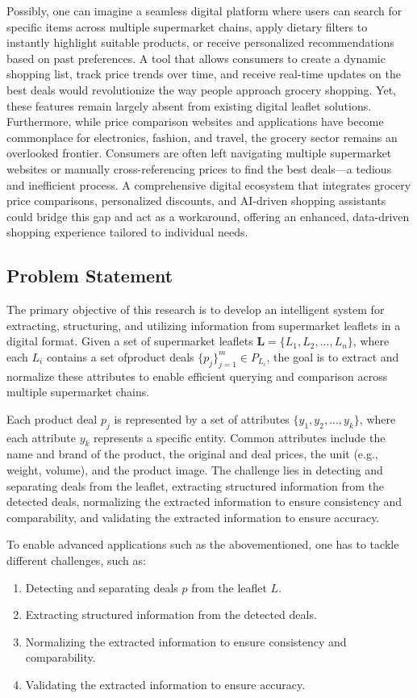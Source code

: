\documentclass[11pt]{article}
\begin{document}
Possibly, one can imagine a seamless digital platform where users can search for specific items across multiple supermarket chains, apply dietary filters to instantly highlight suitable products, or receive personalized recommendations based on past preferences. A tool that allows consumers to create a dynamic shopping list, track price trends over time, and receive real-time updates on the best deals would revolutionize the way people approach grocery shopping. Yet, these features remain largely absent from existing digital leaflet solutions. Furthermore, while price comparison websites and applications have become commonplace for electronics, fashion, and travel, the grocery sector remains an overlooked frontier. Consumers are often left navigating multiple supermarket websites or manually cross-referencing prices to find the best deals—a tedious and inefficient process. A comprehensive digital ecosystem that integrates grocery price comparisons, personalized discounts, and AI-driven shopping assistants could bridge this gap and act as a workaround, offering an enhanced, data-driven shopping experience tailored to individual needs.

\subsection{Problem Statement}
The primary objective of this research is to develop an intelligent system for extracting, structuring, and utilizing information from supermarket leaflets in a digital format. Given a set of supermarket leaflets $\mathbf{L} = \{L_1, L_2, ..., L_n\}$, where each $L_i$ contains a set ofproduct deals $\{p_j\}_{j=1}^{m} \in P_{L_i}$, the goal is to extract and normalize these attributes to enable efficient querying and comparison across multiple supermarket chains.

Each product deal $p_j$ is represented by a set of attributes $\{y_1, y_2, ..., y_k\}$, where each attribute $y_k$ represents a specific entity. Common attributes include the name and brand of the product, the original and deal prices, the unit (e.g., weight, volume), and the product image. The challenge lies in detecting and separating deals from the leaflet, extracting structured information from the detected deals, normalizing the extracted information to ensure consistency and comparability, and validating the extracted information to ensure accuracy. 

To enable advanced applications such as the abovementioned, one has to tackle different challenges, such as:
\begin{enumerate}
    \item Detecting and separating deals $p$ from the leaflet $L$.
    \item Extracting structured information from the detected deals.
    \item Normalizing the extracted information to ensure consistency and comparability.
    \item Validating the extracted information to ensure accuracy.
\end{enumerate}
\end{document}
